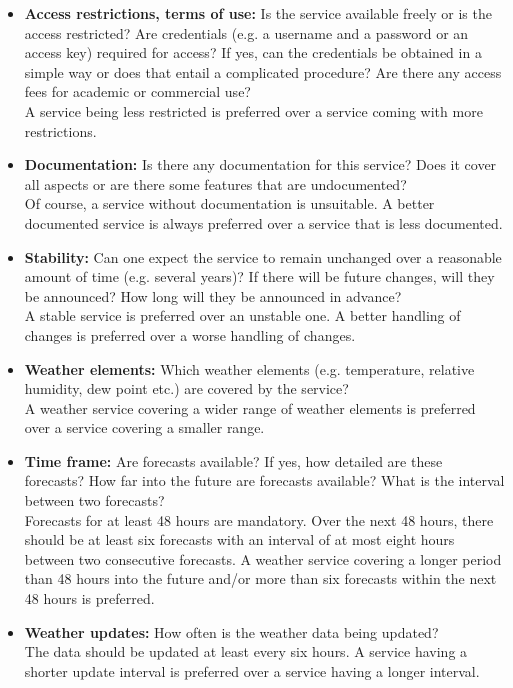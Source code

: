 \begin{itemize}
  \item \textbf{Access restrictions, terms of use:} Is the service available freely or is the access restricted? Are credentials (e.g. a username and a password or an access key) required for access? If yes, can the credentials be obtained in a simple way or does that entail a complicated procedure? Are there any access fees for academic or commercial use?\\
  A service being less restricted is preferred over a service coming with more restrictions.
  
  \item \textbf{Documentation:} Is there any documentation for this service? Does it cover all aspects or are there some features that are undocumented?\\
  Of course, a service without documentation is unsuitable. A better documented service is always preferred over a service that is less documented.
  
  \item \textbf{Stability:} Can one expect the service to remain unchanged over a reasonable amount of time (e.g. several years)? If there will be future changes, will they be announced? How long will they be announced in advance?\\
  A stable service is preferred over an unstable one. A better handling of changes is preferred over a worse handling of changes.
  
  \item \textbf{Weather elements:} Which weather elements (e.g. temperature, relative humidity, dew point etc.) are covered by the service?\\
  A weather service covering a wider range of weather elements is preferred over a service covering a smaller range.
  
  \item \textbf{Time frame:} Are forecasts available? If yes, how detailed are these forecasts? How far into the future are forecasts available? What is the interval between two forecasts?\\
  Forecasts for at least 48 hours are mandatory. Over the next 48 hours, there should be at least six forecasts with an interval of at most eight hours between two consecutive forecasts. A weather service covering a longer period than 48 hours into the future and/or more than six forecasts within the next 48 hours is preferred.
  
  \item \textbf{Weather updates:} How often is the weather data being updated?\\
  The data should be updated at least every six hours. A service having a shorter update interval is preferred over a service having a longer interval.
\end{itemize}

